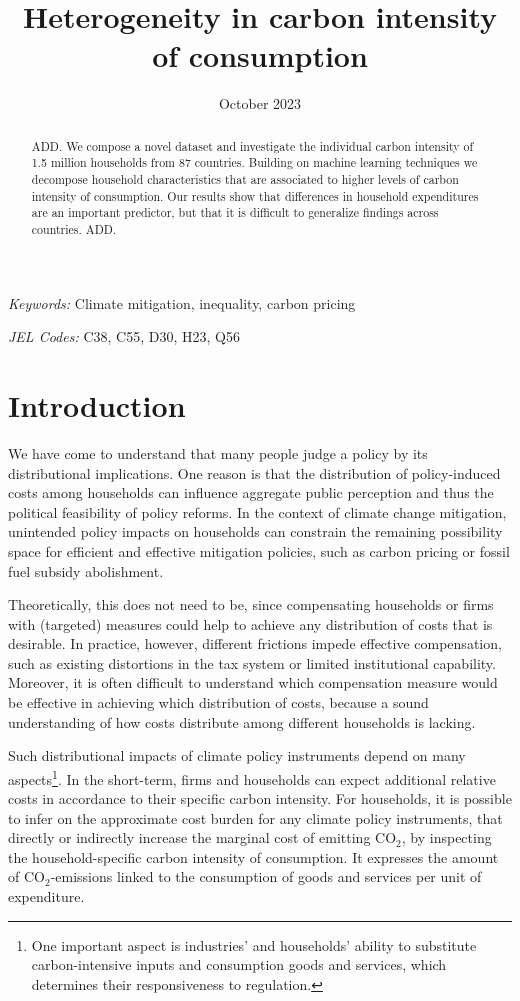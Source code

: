 \documentclass[12pt, a4paper]{article}
\title{Heterogeneity in carbon intensity of consumption}
\date{October 2023}
\begin{document}
\maketitle
\begin{abstract}
  ADD. We compose a novel dataset and investigate the individual carbon intensity of 1.5 million households from 87 countries. Building on machine learning techniques we decompose household characteristics that are associated to higher levels of carbon intensity of consumption. Our results show that differences in household expenditures are an important predictor, but that it is difficult to generalize findings across countries. ADD.
\end{abstract}

\smallskip

\noindent \small \textit{Keywords:} Climate mitigation, inequality, carbon pricing

\noindent \small \textit{JEL Codes:} C38, C55, D30, H23, Q56

\thispagestyle{empty}
\clearpage
\setcounter{page}{1}

\section{Introduction} \label{sec:introduction}

We have come to understand that many people judge a policy by its distributional implications. One reason is that the distribution of policy-induced costs among households can influence aggregate public perception and thus the political feasibility of policy reforms. In the context of climate change mitigation, unintended policy impacts on households can constrain the remaining possibility space for efficient and effective mitigation policies, such as carbon pricing or fossil fuel subsidy abolishment.

Theoretically, this does not need to be, since compensating households or firms with (targeted) measures could help to achieve any distribution of costs that is desirable. In practice, however, different frictions impede effective compensation, such as existing distortions in the tax system or limited institutional capability. Moreover, it is often difficult to understand which compensation measure would be effective in achieving which distribution of costs, because a sound understanding of how costs distribute among different households is lacking.

Such distributional impacts of climate policy instruments depend on many aspects\footnote{One important aspect is industries' and households' ability to substitute carbon-intensive inputs and consumption goods and services, which determines their responsiveness to regulation.}. In the short-term, firms and households can expect additional relative costs in accordance to their specific carbon intensity. For households, it is possible to infer on the approximate cost burden for any climate policy instruments, that directly or indirectly increase the marginal cost of emitting CO$_{2}$, by inspecting the household-specific carbon intensity of consumption. It expresses the amount of CO$_{2}$-emissions linked to the consumption of goods and services per unit of expenditure.
\end{document}

